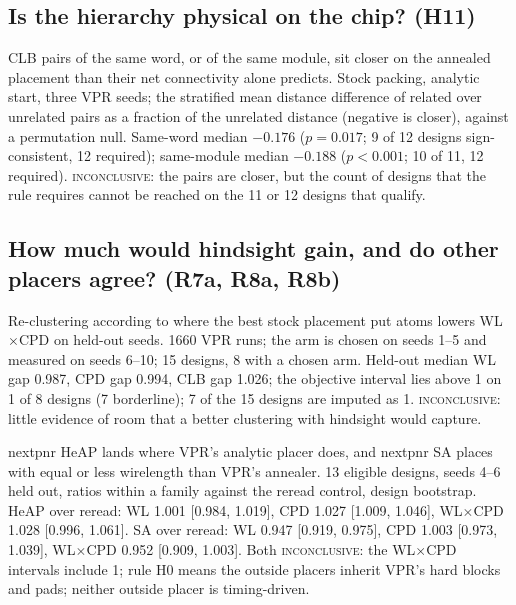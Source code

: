 \subsection{Is the hierarchy physical on the chip? (H11)}
\label{sec:e-hier}

 CLB pairs of the same word, or of the same module, sit closer on the annealed placement than their net connectivity alone predicts.
 Stock packing, analytic start, three VPR seeds; the stratified mean distance difference of related over unrelated pairs as a fraction of the unrelated distance (negative is closer), against a permutation null.
 Same-word median $-0.176$ ($p=0.017$; 9 of 12 designs sign-consistent, 12 required); same-module median $-0.188$ ($p<0.001$; 10 of 11, 12 required). %
 \textsc{inconclusive}: the pairs are closer, but the count of designs that the rule requires cannot be reached on the 11 or 12 designs that qualify.

\subsection{How much would hindsight gain, and do other placers agree? (R7a, R8a, R8b)}
\label{sec:e-hind}

 Re-clustering according to where the best stock placement put atoms lowers WL$\times$CPD on held-out seeds.
 1660 VPR runs; the arm is chosen on seeds 1--5 and measured on seeds 6--10; 15 designs, 8 with a chosen arm.
 Held-out median WL gap 0.987, CPD gap 0.994, CLB gap 1.026; the objective interval lies above 1 on 1 of 8 designs (7 borderline); 7 of the 15 designs are imputed as 1. %
 \textsc{inconclusive}: little evidence of room that a better clustering with hindsight would capture.

 nextpnr HeAP lands where VPR's analytic placer does, and nextpnr SA places with equal or less wirelength than VPR's annealer.
 13 eligible designs, seeds 4--6 held out, ratios within a family against the reread control, design bootstrap.
 HeAP over reread: WL 1.001 [0.984, 1.019], CPD 1.027 [1.009, 1.046], WL$\times$CPD 1.028 [0.996, 1.061]. SA over reread: WL 0.947 [0.919, 0.975], CPD 1.003 [0.973, 1.039], WL$\times$CPD 0.952 [0.909, 1.003]. %
 Both \textsc{inconclusive}: the WL$\times$CPD intervals include 1; rule H0 means the outside placers inherit VPR's hard blocks and pads; neither outside placer is timing-driven.

